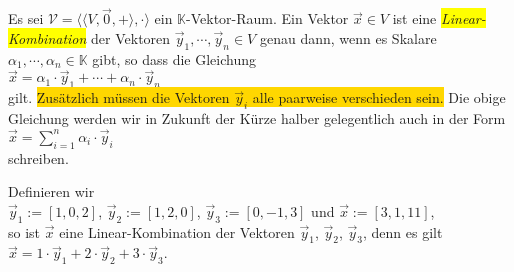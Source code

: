 \begin{Definition} \lb
Es sei $\mathcal{V} = \bigl\langle \langle V, \vec{0}, + \rangle, \cdot \bigr\rangle$ ein $\mathbb{K}$-Vektor-Raum.  Ein Vektor $\vec{x} \in V$ ist eine
\colorbox{yellow}{\emph{Linear-Kombination}} der Vektoren $\vec{y}_1, \cdots, \vec{y}_n \in V$ genau dann, wenn es Skalare
$\alpha_1, \cdots, \alpha_n \in \mathbb{K}$ gibt, so dass die Gleichung
\\[0.2cm]
\hspace*{1.3cm}
$\vec{x} = \alpha_1 \cdot \vec{y}_1 + \cdots + \alpha_n \cdot \vec{y}_n$
\\[0.2cm]
gilt.  
\colorbox{gold}{Zus\"{a}tzlich m\"{u}ssen die Vektoren $\vec{y}_i$ alle paarweise verschieden sein.}
Die obige Gleichung werden wir in Zukunft der K\"{u}rze halber gelegentlich auch in der Form
\\[0.2cm]
\hspace*{1.3cm}
$\vec{x} = \sum\limits_{i=1}^n \alpha_i \cdot \vec{y}_i$
\\[0.2cm]
schreiben.
\eoxs
\end{Definition}

\example
Definieren wir
\\[0.2cm]
\hspace*{1.3cm}
$\vec{y}_1 := [1, 0, 2]$, \quad  $\vec{y}_2 := [1, 2, 0]$, \quad  $\vec{y}_3 := [0, -1, 3]$  \quad und \quad  $\vec{x} := [3, 1, 11]$,
\\[0.2cm]
so ist $\vec{x}$ eine Linear-Kombination der Vektoren $\vec{y}_1$, $\vec{y}_2$, $\vec{y}_3$, denn es gilt
\\[0.2cm]
\hspace*{1.3cm}
$\vec{x} = 1 \cdot \vec{y}_1 + 2 \cdot \vec{y}_2 + 3 \cdot \vec{y}_3$.  \eoxs

